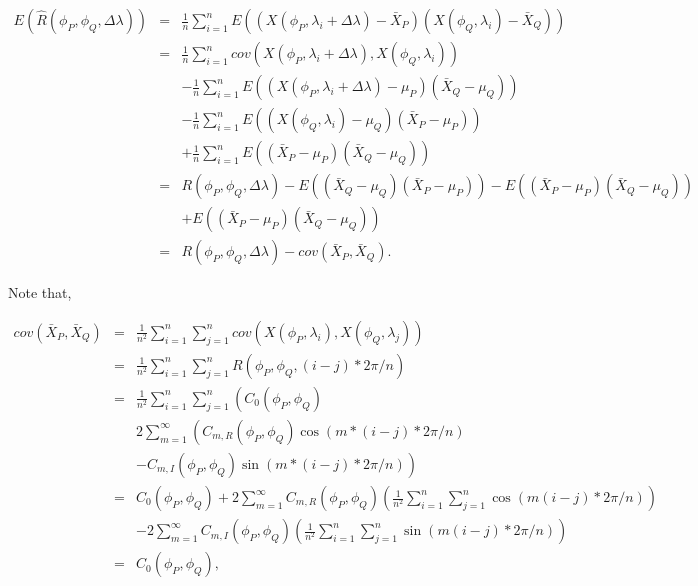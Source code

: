 	\begin{eqnarray*}
		E(\hat{R}(\phi_P, \phi_Q, \Delta \lambda)) &=& \frac{1}{n}\sum_{i = 1}^n E((X(\phi_P, \lambda_i + \Delta \lambda) - \bar{X}_P)(X(\phi_Q, \lambda_i) - \bar{X}_Q)) \\
		&=& \frac{1}{n}\sum_{i=1}^n cov(X(\phi_P, \lambda_i+\Delta \lambda), X(\phi_Q, \lambda_i)) \\
		& & - \frac{1}{n}\sum_{i = 1}^n E((X(\phi_P, \lambda_i + \Delta \lambda) - \mu_P)(\bar{X}_Q - \mu_Q)) \\
		& & -\frac{1}{n}\sum_{i = 1}^n E((X(\phi_Q, \lambda_i) - \mu_Q)(\bar{X}_P - \mu_P)) \\
		& & + \frac{1}{n}\sum_{i = 1}^n E((\bar{X}_P - \mu_P)(\bar{X}_Q - \mu_Q)) \\
		&=& R(\phi_P, \phi_Q, \Delta \lambda) -E((\bar{X}_Q - \mu_Q)(\bar{X}_P - \mu_P)) - E((\bar{X}_P - \mu_P)(\bar{X}_Q - \mu_Q)) \\
		& &  + E((\bar{X}_P - \mu_P)(\bar{X}_Q - \mu_Q)) \\
		&=& R(\phi_P, \phi_Q, \Delta \lambda) - cov(\bar{X}_P, \bar{X}_Q).
	\end{eqnarray*}
	
	Note that, 
	
	\begin{eqnarray*}
		cov(\bar{X}_P, \bar{X}_Q) &=&  \frac{1}{n^2}\sum_{i = 1}^n \sum_{j=1}^n cov(X(\phi_P, \lambda_i), X(\phi_Q, \lambda_j)) \\
		&=& \frac{1}{n^2}\sum_{i = 1}^n \sum_{j=1}^n R(\phi_P, \phi_Q, (i-j)*2\pi/n) \\
		&=& \frac{1}{n^2}\sum_{i = 1}^n \sum_{j=1}^n \left( C_0(\phi_P, \phi_Q) \right.\\
		& &  2\sum_{m=1}^\infty \left( C_{m, R}(\phi_P, \phi_Q) \cos(m*(i-j)*2\pi/n) \right. \\
		& & \left.- C_{m, I}(\phi_P, \phi_Q) \sin(m*(i-j)*2\pi/n) \right) \\
		&=& C_0(\phi_P, \phi_Q) + 2\sum_{m=1}^\infty C_{m, R}(\phi_P, \phi_Q) \left(\frac{1}{n^2}\sum_{i = 1}^n \sum_{j=1}^n \cos(m(i-j)*2\pi/n)\right) \\
		& & - 2\sum_{m=1}^\infty C_{m, I}(\phi_P, \phi_Q) \left(\frac{1}{n^2}\sum_{i = 1}^n \sum_{j=1}^n \sin(m(i-j)*2\pi/n)\right) \\
		&=& C_0(\phi_P, \phi_Q),
	\end{eqnarray*}
	
